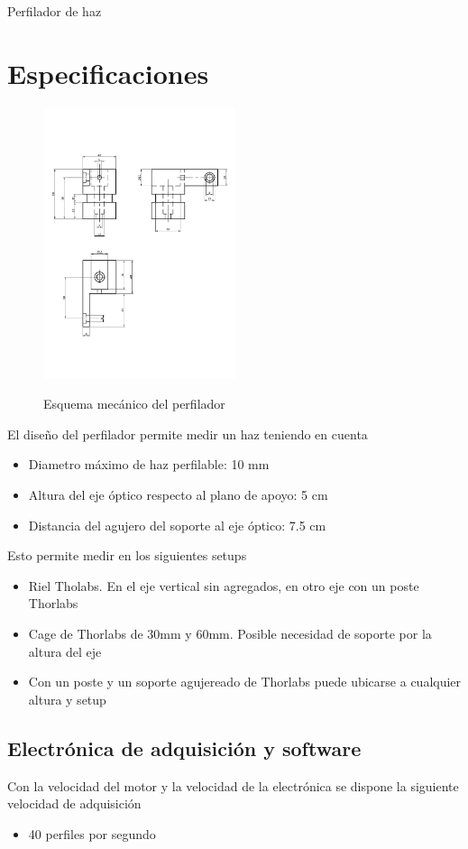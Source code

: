 \documentclass[a4paper]{article}
\begin{document}
{\large Perfilador de haz}

\section{Especificaciones}

\begin{figure}[H]
  \includegraphics[width=0.5\textwidth]{mecanica.pdf}
  \label{fig:mecanica}
  \caption{Esquema mecánico del perfilador}
\end{figure}

El diseño del perfilador permite medir un haz teniendo en cuenta
\begin{itemize}
  \item Diametro máximo de haz perfilable: 10 mm
  \item Altura del eje óptico respecto al plano de apoyo: 5 cm
  \item Distancia del agujero del soporte al eje óptico: 7.5 cm
\end{itemize}

Esto permite medir en los siguientes setups
\begin{itemize}
  \item Riel Tholabs. En el eje vertical sin agregados, en otro eje con un poste Thorlabs
  \item Cage de Thorlabs de 30mm y 60mm. Posible necesidad de soporte por la altura del eje
  \item Con un poste y un soporte agujereado de Thorlabs puede ubicarse a cualquier altura y setup
\end{itemize}

\subsection{Electrónica de adquisición y software}
Con la velocidad del motor y la velocidad de la electrónica se dispone la siguiente velocidad de adquisición
\begin{itemize}
  \item 40 perfiles por segundo
\end{itemize}
\end{document}
